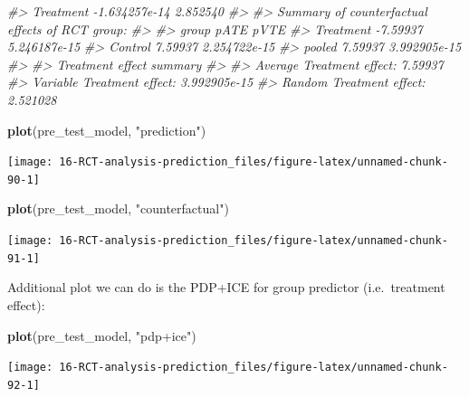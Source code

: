 \documentclass[
]{book}
\newenvironment{Shaded}{\begin{snugshade}}{\end{snugshade}}
\newcommand{\CommentTok}[1]{\textcolor[rgb]{0.56,0.35,0.01}{\textit{#1}}}
\newcommand{\KeywordTok}[1]{\textcolor[rgb]{0.13,0.29,0.53}{\textbf{#1}}}
\newcommand{\NormalTok}[1]{#1}
\newcommand{\StringTok}[1]{\textcolor[rgb]{0.31,0.60,0.02}{#1}}
\begin{document}
\begin{Shaded}
\begin{Highlighting}[]
\CommentTok{\#>  Treatment {-}1.634257e{-}14 2.852540}
\CommentTok{\#> }
\CommentTok{\#> Summary of counterfactual effects of RCT group:}
\CommentTok{\#> }
\CommentTok{\#>      group     pATE         pVTE}
\CommentTok{\#>  Treatment {-}7.59937 5.246187e{-}15}
\CommentTok{\#>    Control  7.59937 2.254722e{-}15}
\CommentTok{\#>     pooled  7.59937 3.992905e{-}15}
\CommentTok{\#> }
\CommentTok{\#> Treatment effect summary}
\CommentTok{\#> }
\CommentTok{\#> Average Treatment effect:  7.59937}
\CommentTok{\#> Variable Treatment effect:  3.992905e{-}15}
\CommentTok{\#> Random Treatment effect:  2.521028}
\end{Highlighting}
\end{Shaded}

\begin{Shaded}
\begin{Highlighting}[]
\KeywordTok{plot}\NormalTok{(pre\_test\_model, }\StringTok{"prediction"}\NormalTok{)}
\end{Highlighting}
\end{Shaded}

\begin{center}\texttt{[image: 16-RCT-analysis-prediction\_files/figure-latex/unnamed-chunk-90-1]} \end{center}

\begin{Shaded}
\begin{Highlighting}[]
\KeywordTok{plot}\NormalTok{(pre\_test\_model, }\StringTok{"counterfactual"}\NormalTok{)}
\end{Highlighting}
\end{Shaded}

\begin{center}\texttt{[image: 16-RCT-analysis-prediction\_files/figure-latex/unnamed-chunk-91-1]} \end{center}

Additional plot we can do is the PDP+ICE for group predictor (i.e.~treatment effect):

\begin{Shaded}
\begin{Highlighting}[]
\KeywordTok{plot}\NormalTok{(pre\_test\_model, }\StringTok{"pdp+ice"}\NormalTok{)}
\end{Highlighting}
\end{Shaded}

\begin{center}\texttt{[image: 16-RCT-analysis-prediction\_files/figure-latex/unnamed-chunk-92-1]} \end{center}
\end{document}
